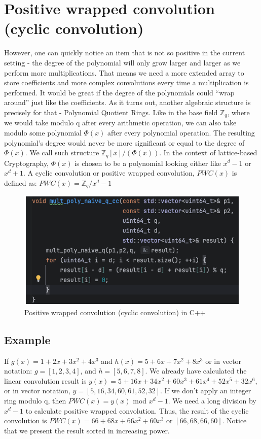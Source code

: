 \documentclass{techrep}
\theoremstyle{definition}
\theoremstyle{plain}
\newcommand{\Z}{\mathbb{Z}}
\begin{document}
	\section{Positive wrapped convolution (cyclic convolution)}
	However, one can quickly notice an item that is not so positive in the current setting - the degree of the polynomial will only grow larger and larger as we perform more multiplications. That means we need a more extended array to store coefficients and more complex convolutions every time a multiplication is performed. It would be great if the degree of the polynomials could “wrap around” just like the coefficients. As it turns out, another algebraic structure is precisely for that - Polynomial Quotient Rings. Like in the base field  $\Z_{q}$, where we would take modulo q after every arithmetic operation, we can also take modulo some polynomial $\Phi(x)$ after every polynomial operation. The resulting polynomial’s degree would never be more significant or equal to the degree of $\Phi(x)$. We call such structure $\Z_{q}[x]/(\Phi(x))$. In the context of lattice-based Cryptography, $\Phi(x)$ is chosen to be a polynomial looking either like $x^d - 1$ or $x^d + 1$.  A cyclic convolution or positive wrapped convolution, $PWC(x)$ is defined as: $PWC(x) = \Z_{q}/x^d - 1$


	\begin{figure}[H]
		\centering
		\includegraphics[width=.9\columnwidth]{fig/PWC_cplus.png}
		\caption{Positive wrapped convolution (cyclic convolution) in C++}
		\label{fig:PWC_cplus}
	\end{figure}



	\subsection{Example}
	If $g(x) = 1 + 2x + 3x^2 + 4x^3$ and $h(x) = 5 + 6x + 7x^2 + 8x^3$ or in vector notation:  $g = [1, 2, 3, 4]$, and $h = [5, 6, 7, 8]$. We already have calculated the linear convolution result is $y(x) = 5 + 16x + 34x^2 + 60x^3 + 61x^4 + 52x^5 + 32x^6$, or in vector notation, $y = [5, 16, 34, 60, 61, 52, 32]$. If we don't apply an integer ring modulo q, then $PWC(x) = y(x)$ mod $x^d - 1$.  We need a long division by $x^d - 1$ to calculate positive wrapped convolution. Thus, the result of the cyclic convolution is $PWC(x) = 66 + 68x + 66x^2 + 60x^3$ or $[66, 68, 66, 60]$. Notice that we present the result sorted in increasing power.
\end{document}
